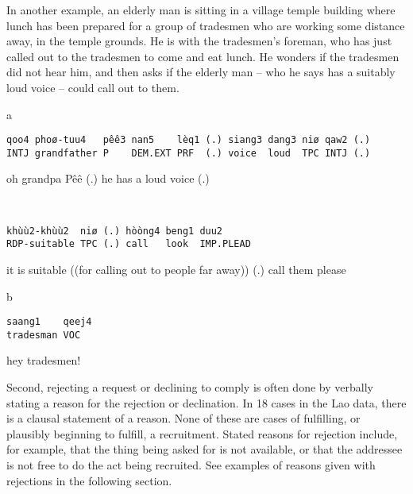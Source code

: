 \documentclass[output=paper]{langsci/langscibook}
\begin{document}
In another example, an elderly man is sitting in a village temple building where lunch has been prepared for a group of tradesmen who are working some distance away, in the temple grounds. He is with the tradesmen’s foreman, who has just called out to the tradesmen to come and eat lunch. He wonders if the tradesmen did not hear him, and then asks if the elderly man -- who he says has a suitably loud voice -- could call out to them.

\vspace{-1mm}
%
\begin{mdframednoverticalspace}[style=firstfoc]
\begin{transbox}{1}{a}
\begin{verbatim}
qoo4 phoø-tuu4   pêê3 nan5    lèq1 (.) siang3 dang3 niø qaw2 (.)
INTJ grandfather P    DEM.EXT PRF  (.) voice  loud  TPC INTJ (.)
\end{verbatim}
oh grandpa Pêê (.) he has a loud voice (.)
\end{transbox}
\end{mdframednoverticalspace}
%
\begin{mdframednoverticalspace}[style=firstfoc]
\begin{transbox}{2}{~}
\begin{verbatim}
khùù2-khùù2  niø (.) hòòng4 beng1 duu2
RDP-suitable TPC (.) call   look  IMP.PLEAD
\end{verbatim}
it is suitable ((for calling out to people far away)) (.) call them please
\end{transbox}
\end{mdframednoverticalspace}
%
\begin{mdframednoverticalspace}[style=secondfoc]
\begin{transbox}{3}{b}
\begin{verbatim}
saang1    qeej4
tradesman VOC
\end{verbatim}
hey tradesmen!
\end{transbox}
\end{mdframednoverticalspace}\bigskip

Second, rejecting a request or declining to comply is often done by verbally stating a reason for the rejection or declination. In 18 cases in the Lao data, there is a clausal statement of a reason. None of these are cases of fulfilling, or plausibly beginning to fulfill, a recruitment. Stated reasons for rejection include, for example, that the thing being asked for is not available, or that the addressee is not free to do the act being recruited. See examples of reasons given with rejections in the following section.
\end{document}
